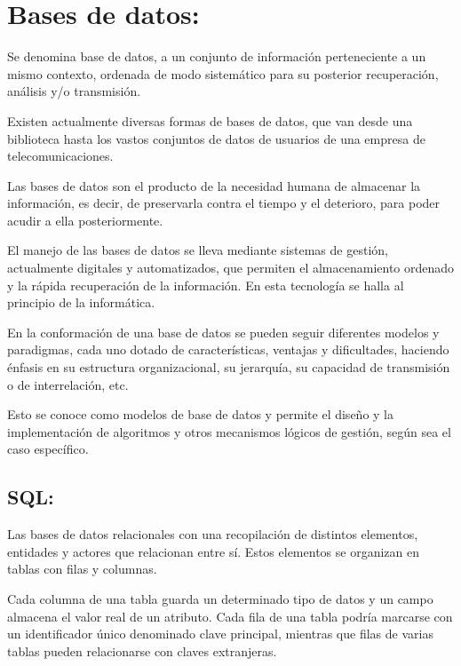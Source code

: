 \documentclass[conference,compsoc,onecolumn]{IEEEtran}
\begin{document}
\section{Bases de datos:}

Se denomina base de datos, a un conjunto de información perteneciente a un mismo contexto, ordenada de modo sistemático para su posterior recuperación, análisis y/o transmisión.\newline 

Existen actualmente diversas formas de bases de datos, que van desde una biblioteca hasta los vastos conjuntos de datos de usuarios de una empresa de telecomunicaciones.

Las bases de datos son el producto de la necesidad humana de almacenar la información, es decir, de preservarla contra el tiempo y el deterioro, para poder acudir a ella posteriormente.\newline  

El manejo de las bases de datos se lleva mediante sistemas de gestión, actualmente digitales y automatizados, que permiten el almacenamiento ordenado y la rápida recuperación de la información. En esta tecnología se halla al principio de la informática.\newline 

En la conformación de una base de datos se pueden seguir diferentes modelos y paradigmas, cada uno dotado de características, ventajas y dificultades, haciendo énfasis en su estructura organizacional, su jerarquía, su capacidad de transmisión o de interrelación, etc.\newline 

Esto se conoce como modelos de base de datos y permite el diseño y la implementación de algoritmos y otros mecanismos lógicos de gestión, según sea el caso específico.\newline 

\subsection{SQL:}

Las bases de datos relacionales con una recopilación de distintos elementos, entidades y actores que relacionan entre sí. Estos elementos se organizan en tablas con filas y columnas. \newlineew

Cada columna de una tabla guarda un determinado tipo de datos y un campo almacena el valor real de un atributo. Cada fila de una tabla podría marcarse con un identificador único denominado clave principal, mientras que filas de varias tablas pueden relacionarse con claves extranjeras.\newline
\end{document}
